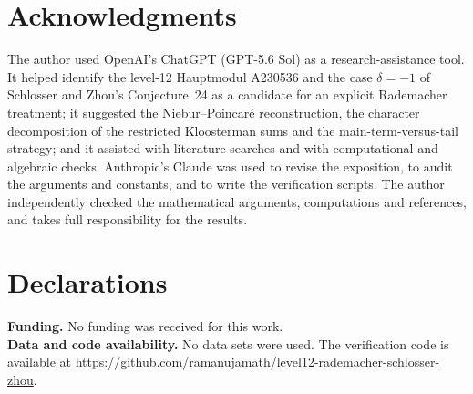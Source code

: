 \documentclass[11pt]{amsart}
\numberwithin{equation}{section}
\theoremstyle{definition}
\theoremstyle{remark}
\begin{document}
\section*{Acknowledgments}
The author used OpenAI's ChatGPT (GPT-5.6 Sol) as a research-assistance tool. It helped identify the level-12 Hauptmodul A230536 and the case $\delta=-1$ of Schlosser and Zhou's Conjecture~24 as a candidate for an explicit Rademacher treatment; it suggested the Niebur--Poincaré reconstruction, the character decomposition of the restricted Kloosterman sums and the main-term-versus-tail strategy; and it assisted with literature searches and with computational and algebraic checks. Anthropic's Claude was used to revise the exposition, to audit the arguments and constants, and to write the verification scripts. The author independently checked the mathematical arguments, computations and references, and takes full responsibility for the results.

\section*{Declarations}
\noindent\textbf{Funding.} No funding was received for this work.\\
\textbf{Data and code availability.} No data sets were used. The verification code is available at \url{https://github.com/ramanujamath/level12-rademacher-schlosser-zhou}.
\end{document}
